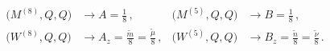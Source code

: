 \begin{equation}
\begin{aligned}
\big(M^{(8)}, Q, Q\big) &\rightarrow A =\tfrac{1}{8}\, ,&
\big(M^{(5)}, Q, Q\big) &\rightarrow B =\tfrac{1}{8}\, ,\\[1ex]
\big(W^{(8)}, Q, Q\big) &\rightarrow A_z =\tfrac{\tilde m}{8}=\tfrac{\tilde\mu}{8}\, ,&
\big(W^{(5)}, Q, Q\big) &\rightarrow B_z =\tfrac{\tilde n}{8}=\tfrac{\tilde\nu}{8}\, .
\end{aligned}
\end{equation}


